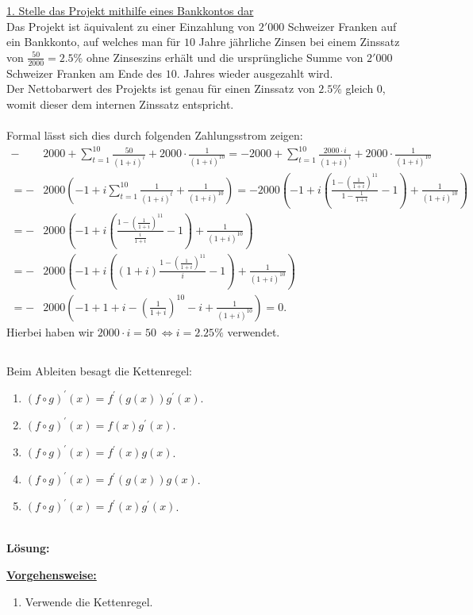 \underline{1. Stelle das Projekt mithilfe eines Bankkontos dar}\\
Das Projekt ist äquivalent zu einer Einzahlung von $2'000$ Schweizer Franken auf ein Bankkonto, auf welches man für $10$ Jahre jährliche Zinsen bei einem Zinssatz von $\frac{50}{2000} = 2.5 \%$ ohne Zinseszins erhält und die ursprüngliche Summe von $2'000$ Schweizer Franken am Ende des $10$. Jahres wieder ausgezahlt wird.\\
Der Nettobarwert des Projekts ist genau für einen Zinssatz von $2.5 \% $ gleich 0, womit dieser dem internen Zinssatz entspricht.\\
\\
Formal lässt sich dies durch folgenden Zahlungsstrom zeigen:
\begin{align*}
	-&2000 + \sum \limits_{t = 1}^{10} \frac{50}{(1+i)^i} + 2000 \cdot \frac{1}{(1+i)^{10}}
	=
	-2000 + \sum \limits_{t = 1}^{10} \frac{2000 \cdot i}{(1+i)^i} + 2000 \cdot \frac{1}{(1+i)^{10}}\\
	=
	-&2000 \left(-1 + i \sum \limits_{t = 1}^{10 }\frac{1}{(1+i)^t} + \frac{1}{(1+i)^{10}} \right) 
	=
	-2000 \left(-1 + i \left(\frac{1 - \left(\frac{1}{1+i}\right)^{11} }{1 - \frac{1}{1+i}} -1 \right)+ \frac{1}{(1+i)^{10}} \right)\\
	=
	-&2000 \left(-1 + i \left(\frac{1 - \left(\frac{1}{1+i}\right)^{11} }{ \frac{i}{1+i}}  -1 \right)+ \frac{1}{(1+i)^{10}} \right)\\
	=
	-&2000 \left(-1 + i \left( (1+i)\frac{1 - \left(\frac{1}{1+i}\right)^{11} }{ i} -1 \right)+ \frac{1}{(1+i)^{10}} \right )\\
	=
	-&2000 \left(-1 +  1+i  - \left(\frac{1}{1+i}\right)^{10}  -i + \frac{1}{(1+i)^{10}} \right )
	= 0.
\end{align*}
Hierbei haben wir $2000 \cdot i = 50   \ \Leftrightarrow i = 2.25 \%$ verwendet. 


 \newpage

\subsection*{}
Beim Ableiten besagt die Kettenregel:
\renewcommand{\labelenumi}{(\alph{enumi})}
\begin{enumerate}
	\item 
	$ (f \circ g)^\prime(x) = f^\prime(g(x)) g^\prime(x)$.
	\item 
	$ (f \circ g)^\prime(x) = f(x) g^\prime(x)$.
	\item
	$ (f \circ g)^\prime(x) = f^\prime(x) g(x)$.
	\item
	$ (f \circ g)^\prime(x) = f^\prime(g(x)) g(x)$.
	\item
	$ (f \circ g)^\prime(x) = f^\prime(x) g^\prime(x)$.
\end{enumerate}
\ \\
\textbf{Lösung:}
\begin{mdframed}
\underline{\textbf{Vorgehensweise:}}
\renewcommand{\labelenumi}{\theenumi.}
\begin{enumerate}
\item Verwende die Kettenregel.
\end{enumerate}
\end{mdframed}

